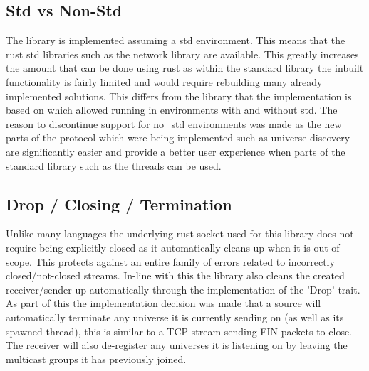 \documentclass[11pt,a4paper]{article}
\begin{document}
\subsection{Std vs Non-Std}
The library is implemented assuming a std environment. This means that the rust std libraries such as the network library are available. This greatly increases the amount that can be done using rust as within the standard library the inbuilt functionality is fairly limited and would require rebuilding many already implemented solutions. This differs from the library that the implementation is based on which allowed running in environments with and without std. The reason to discontinue support for no\_std environments was made as the new parts of the protocol which were being implemented such as universe discovery are significantly easier and provide a better user experience when parts of the standard library such as the threads can be used. \\

\subsection{Drop / Closing / Termination}
Unlike many languages the underlying rust socket used for this library does not require being explicitly closed as it automatically cleans up when it is out of scope. This protects against an entire family of errors related to incorrectly closed/not-closed streams. In-line with this the library also cleans the created receiver/sender up automatically through the implementation of the 'Drop' trait. As part of this the implementation decision was made that a source will automatically terminate any universe it is currently sending on (as well as its spawned thread), this is similar to a TCP stream sending FIN packets to close. The receiver will also de-register any universes it is listening on by leaving the multicast groups it has previously joined. \\
\end{document}
